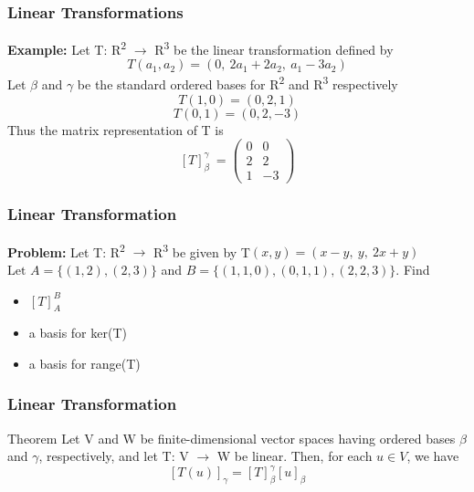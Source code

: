 \documentclass[11pt]{beamer}
\begin{document}
\begin{frame}
	\frametitle{Linear Transformations}
	\textbf{Example: } Let T: R\textsuperscript{2} $\rightarrow$ R\textsuperscript{3} be the linear transformation defined by
	\[ T(a_{1}, a_{2}) = (0,\ 2a_{1} + 2a_{2},\ a_{1} - 3a_{2})\]
	Let $\beta$ and $\gamma$ be the standard ordered bases for R\textsuperscript{2} and R\textsuperscript{3} respectively
	\[ T(1,0) = (0,2,1)\]
	\[ T(0,1) = (0, 2, -3)\]
	Thus the matrix representation of T is
	\[ \left[T \right]_{\beta}^{\gamma}\ = \begin{pmatrix}
		0 & 0 \\
		2 & 2 \\
		1 & -3
	\end{pmatrix}\] 
\end{frame}

\begin{frame}
	\frametitle{Linear Transformation}
	\textbf{Problem: }Let T: R\textsuperscript{2} $\rightarrow$ R\textsuperscript{3} be given by T$(x,y) = (x-y,\ y,\ 2x+y)$ 
	$\text{Let } A = \{ (1,2), (2,3)\} $ and $B = \{(1,1,0), (0,1,1), (2,2,3) \}$. Find 
	\begin{itemize}
		\item 	$\left[T \right]_{A}^{B}$
		\item a basis for ker(T)
		\item a basis for range(T)
	\end{itemize}

\end{frame}

\begin{frame}
	\frametitle{Linear Transformation}
	\begin{block}{Theorem}
		Let V and W be finite-dimensional vector spaces having ordered bases $\beta$ and $\gamma$, respectively, and let T: V $\rightarrow$ W be linear. Then, for each $u \in V$, we have
		\[ \left[ T(u) \right]_{\gamma} = \left[ T \right]_{\beta}^{\gamma} \left[ u \right]_{\beta} \]
	\end{block} 
\end{frame}
\end{document}
